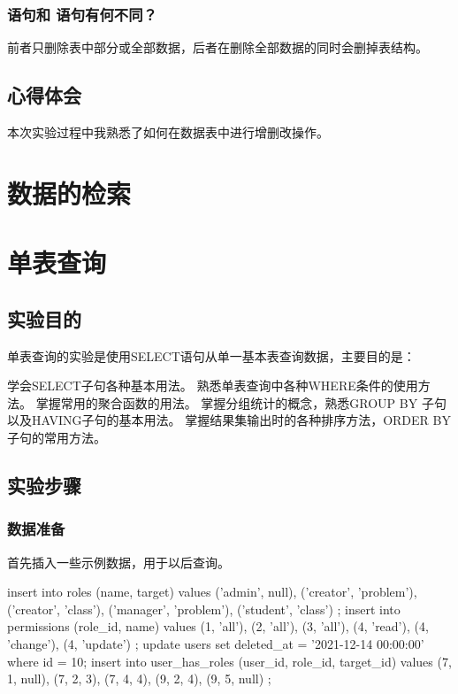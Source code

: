 \documentclass{ctexrep}
\begin{document}
\subsection*{ 语句和  语句有何不同？}
前者只删除表中部分或全部数据，后者在删除全部数据的同时会删掉表结构。

\section{心得体会}

本次实验过程中我熟悉了如何在数据表中进行增删改操作。



\chapter{数据的检索}

\begingroup
\renewcommand{\cleardoublepage}{}
\renewcommand{\clearpage}{}
\chapter*{单表查询}
\endgroup
\section{实验目的}

单表查询的实验是使用SELECT语句从单一基本表查询数据，主要目的是：
\begin{outline}[enumerate]
    \1 学会SELECT子句各种基本用法。
    \1 熟悉单表查询中各种WHERE条件的使用方法。
    \1 掌握常用的聚合函数的用法。
    \1 掌握分组统计的概念，熟悉GROUP BY 子句以及HAVING子句的基本用法。
    \1 掌握结果集输出时的各种排序方法，ORDER  BY子句的常用方法。
\end{outline}
\section{实验步骤}
\subsection{数据准备}
首先插入一些示例数据，用于以后查询。
\begin{run}
    insert into roles (name, target) values 
        ('admin', null),
        ('creator', 'problem'),
        ('creator', 'class'),
        ('manager', 'problem'),
        ('student', 'class')
    ;
    insert into permissions (role_id, name) values 
        (1, 'all'),
        (2, 'all'),
        (3, 'all'),
        (4, 'read'),
        (4, 'change'),
        (4, 'update')
    ;
    update users set deleted_at = '2021-12-14 00:00:00' where id = 10;
    insert into user_has_roles (user_id, role_id, target_id) values 
        (7, 1, null),
        (7, 2, 3),
        (7, 4, 4),
        (9, 2, 4),
        (9, 5, null)
    ;
\end{run}
\end{document}
